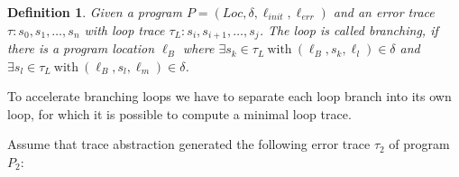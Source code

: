 \documentclass{article}
\newtheorem{mydef}{Definition}
\newcommand\mycom[1]{}
\newcommand\mycom[1]{#1}
\newcommand{\ts}[1]{\mycom{\todo[color=green!40,inline]{\small TS: #1}}}
\begin{document}
\begin{mydef}
    Given a program $P = (Loc, \delta, \ell_{init}, \ell_{err})$ and an error trace $\tau: s_0, s_1, \ldots, s_n$ with loop trace $\tau_L: s_i, s_{i+1}, \ldots, s_j$. The loop is called branching, if there is a program location $\ell_B$ where $\exists s_k \in \tau_L\ \text{with}\ (\ell_B, s_k, \ell_l) \in \delta$ and $\exists s_l \in \tau_L\  \text{with}\ (\ell_B, s_l, \ell_m) \in \delta$.
    \ts{Don't use quantifiers as abbreviation in text.}
\end{mydef}

To accelerate branching loops we have to separate each loop branch into its own loop, for which it is possible to compute a minimal loop trace. \\ \par
Assume that trace abstraction generated the following error trace $\tau_2$ of program $P_2$:
\end{document}

